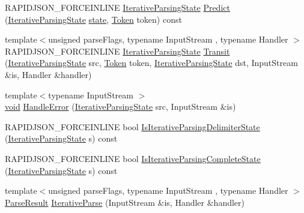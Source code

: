 \begin{DoxyCompactItemize}
\item 
R\+A\+P\+I\+D\+J\+S\+O\+N\+\_\+\+F\+O\+R\+C\+E\+I\+N\+L\+I\+NE \hyperlink{classGenericReader_a269700a68b925db2f3ecc84b75f2277e}{Iterative\+Parsing\+State} \hyperlink{classGenericReader_ad0be8224856167550255d2c9d09f4278}{Predict} (\hyperlink{classGenericReader_a269700a68b925db2f3ecc84b75f2277e}{Iterative\+Parsing\+State} \hyperlink{main__menu__state_8cpp_a59bd38d29733830cd191f2ebe961d501}{state}, \hyperlink{classGenericReader_a78cbc3012843daeaa44cb3c2b779a8a8}{Token} token) const
\item 
{\footnotesize template$<$unsigned parse\+Flags, typename Input\+Stream , typename Handler $>$ }\\R\+A\+P\+I\+D\+J\+S\+O\+N\+\_\+\+F\+O\+R\+C\+E\+I\+N\+L\+I\+NE \hyperlink{classGenericReader_a269700a68b925db2f3ecc84b75f2277e}{Iterative\+Parsing\+State} \hyperlink{classGenericReader_a09637865e7aea8e50fb8f9fc25dd65ad}{Transit} (\hyperlink{classGenericReader_a269700a68b925db2f3ecc84b75f2277e}{Iterative\+Parsing\+State} src, \hyperlink{classGenericReader_a78cbc3012843daeaa44cb3c2b779a8a8}{Token} token, \hyperlink{classGenericReader_a269700a68b925db2f3ecc84b75f2277e}{Iterative\+Parsing\+State} dst, Input\+Stream \&is, Handler \&handler)
\item 
{\footnotesize template$<$typename Input\+Stream $>$ }\\\hyperlink{imgui__impl__opengl3__loader_8h_ac668e7cffd9e2e9cfee428b9b2f34fa7}{void} \hyperlink{classGenericReader_a46660019ff1ed42bc192d9b5f9119b0f}{Handle\+Error} (\hyperlink{classGenericReader_a269700a68b925db2f3ecc84b75f2277e}{Iterative\+Parsing\+State} src, Input\+Stream \&is)
\item 
R\+A\+P\+I\+D\+J\+S\+O\+N\+\_\+\+F\+O\+R\+C\+E\+I\+N\+L\+I\+NE bool \hyperlink{classGenericReader_a115b4d35f57ef8dbe9eef467cba471ae}{Is\+Iterative\+Parsing\+Delimiter\+State} (\hyperlink{classGenericReader_a269700a68b925db2f3ecc84b75f2277e}{Iterative\+Parsing\+State} s) const
\item 
R\+A\+P\+I\+D\+J\+S\+O\+N\+\_\+\+F\+O\+R\+C\+E\+I\+N\+L\+I\+NE bool \hyperlink{classGenericReader_a2907a45d73d2f8cebe1a31bdc3a6e483}{Is\+Iterative\+Parsing\+Complete\+State} (\hyperlink{classGenericReader_a269700a68b925db2f3ecc84b75f2277e}{Iterative\+Parsing\+State} s) const
\item 
{\footnotesize template$<$unsigned parse\+Flags, typename Input\+Stream , typename Handler $>$ }\\\hyperlink{structParseResult}{Parse\+Result} \hyperlink{classGenericReader_a55a2d3fd3d5261f26513ed303724bc3a}{Iterative\+Parse} (Input\+Stream \&is, Handler \&handler)
\end{DoxyCompactItemize}
